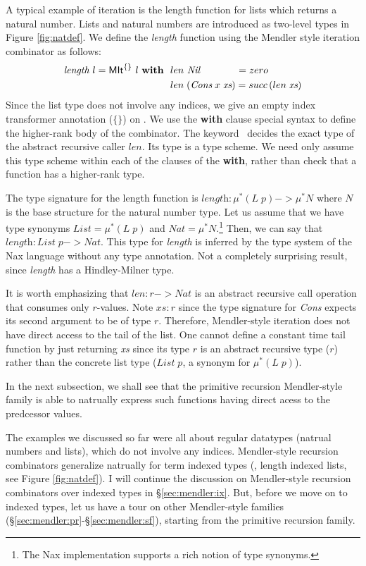 A typical example of iteration is the length function for lists which
returns a natural number. Lists and natural numbers are introduced as two-level types
in Figure \ref{fig:natdef}. We define the \textit{length} function using the Mendler style
iteration combinator as follows:
\begin{align*}
\textit{length}~l = \textsf{MIt}^{\{\}}~l~\textbf{with}~~
&  len ~\textit{Nil}~~~~~~~~~~~ = zero \\
&  len \;(\textit{Cons}\;x\;\textit{xs}) = succ\,(len\;\textit{xs})
\end{align*}
Since the list type does not involve any indices, we give an empty index
transformer annotation ($\{\}$) on \MIt. We use the \textbf{with} clause special
syntax to define the higher-rank body of the combinator. The keyword \MIt\ 
decides the exact type of the abstract recursive caller $len$. Its type is
a type scheme. We need only assume this type scheme within each of the clauses
of the \textbf{with}, rather than check that a function has a higher-rank type.

The type signature for the length function is
$\textit{length}:\mu^{*}(L\;p) -> \mu^{*}N$ where $N$ is the
base structure for the natural number type. Let us assume that we have
type synonyms $\textit{List} = \mu^{*}(L\;p)$ and
$\textit{Nat} = \mu^{*}N $.\footnote{The Nax implementation supports
a rich notion of type synonyms.}
Then, we can say that $\textit{length}:\textit{List}\;p -> \textit{Nat}$.
This type for \textit{length} is inferred by the type system of
the Nax language without any type annotation. Not a completely surprising
result, since \textit{length} has a Hindley-Milner type.

It is worth emphasizing that $len : r -> \textit{Nat}$ is
an abstract recursive call operation that consumes only $r$-values.
Note $\textit{xs}:r$ since the type signature for \textit{Cons} expects
its second argument to be of type $r$. Therefore, Mendler-style iteration
does not have direct access to the tail of the list. One cannot define
a constant time tail function by just returning \textit{xs} since its type $r$
is an abstract recursive type ($r$) rather than the concrete list type
($\textit{List}\;p$, a synonym for $\mu^{*}(L\;p)$). 

In the next subsection, we shall see that the primitive recursion
Mendler-style family is able to natrually express such functions having
direct acess to the predcessor values.

The examples we discussed so far were all about regular datatypes
(natrual numbers and lists), which do not involve any indices.
Mendler-style recursion combinators generalize natrually for term indexed
types (\eg, length indexed lists, see Figure \ref{fig:natdef}).
I will continue the discussion on Mendler-style recursion combinators
over indexed types in \S\ref{sec:mendler:ix}.
But, before we move on to indexed types, let us have a tour on other
Mendler-style families (\S\ref{sec:mendler:pr}-\S\ref{sec:mendler:sf}),
starting from the primitive recursion family.

